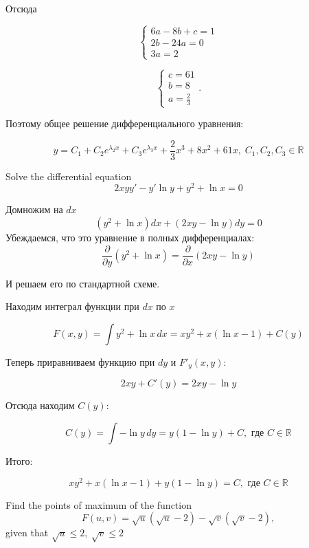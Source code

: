 \documentclass[addpoints]{exam} %
\newcommand{\RR}{\mathbb{R}}
\begin{document}
\begin{questions}
\begin{solution}
  Отсюда

  \[\left\{\begin{array}{l} {6a-8b+c=1} \\ {2b-24a=0} \\ {3a=2} \end{array}\right. \]

  \[\left\{\begin{array}{l} {c=61} \\ {b=8} \\ {a=\frac{2}{3} } \end{array}\right. .\]

  Поэтому общее решение дифференциального уравнения:

  \[y=C_{1} +C_{2} e^{\lambda_2 x} +C_{3} e^{\lambda_3 x} +\frac{2}{3} x^{3} +8x^{2} +61x,\; C_{1} ,C_{2} ,C_{3} \in \RR \]

\end{solution}



\question[10] Solve the differential equation
\[
2xyy' - y' \ln y + y^2 + \ln x =0
\]
\begin{solution}
Домножим на $dx$
\[
(y^2+\ln x)dx + (2xy - \ln y)dy=0
\]
Убеждаемся, что это уравнение в полных дифференциалах:
\[
\frac{\partial}{\partial y}(y^2+\ln x)=\frac{\partial}{\partial x}(2xy - \ln y)
\]

И решаем его по стандартной схеме.

Находим интеграл функции при $dx$ по $x$

\[
F(x,y)=\int  y^2+\ln x \, dx = xy^2 + x(\ln x - 1) + C(y)
\]

Теперь приравниваем функцию при $dy$  и $F'_y(x,y)$:

\[
2xy + C'(y)=2xy - \ln y
\]

Отсюда находим $C(y)$:

\[
C(y)=\int -\ln y \, dy = y(1-\ln y) + C, \text{ где } C\in \RR
\]

Итого:

\[
xy^2+x(\ln x - 1) + y(1-\ln y)=C, \text{ где } C\in \RR
\]


\end{solution}





\question[10] Find the points of maximum of the function
\[
F\left(u,v\right)=\sqrt{u}\left(\sqrt{u}-2\right)-\sqrt{v}\left(\sqrt{v}-2\right),
\]
given that  $\sqrt{u}\le 2,\ \sqrt{v}\le 2$



\end{questions}
\end{document}
